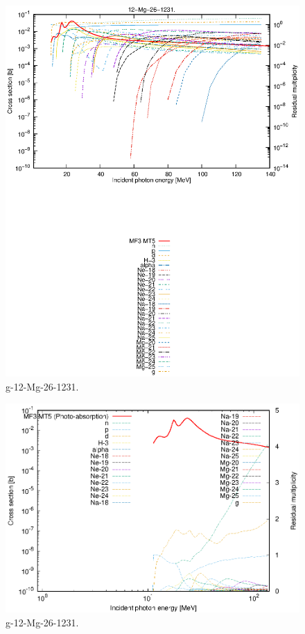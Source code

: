 \begin{figure}
 \includegraphics[width=\linewidth]{eps/g_12-Mg-26_1231.eps}
  \caption{g-12-Mg-26-1231.}
\end{figure}
\newpage \clearpage

\begin{figure}
 \includegraphics[width=\linewidth]{eps-log/g_12-Mg-26_1231.eps}
 \caption{g-12-Mg-26-1231.}
\end{figure}
\newpage \clearpage

